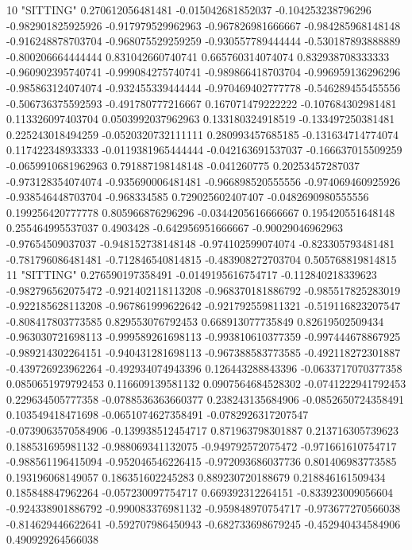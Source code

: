 10 "SITTING" 0.270612056481481 -0.015042681852037 -0.104253238796296 -0.982901825925926 -0.917979529962963 -0.967826981666667 -0.984285968148148 -0.916248878703704 -0.968075529259259 -0.930557789444444 -0.530187893888889 -0.800206664444444 0.831042660740741 0.665760314074074 0.832938708333333 -0.960902395740741 -0.999084275740741 -0.989866418703704 -0.996959136296296 -0.985863124074074 -0.932455339444444 -0.970469402777778 -0.546289455455556 -0.506736375592593 -0.491780777216667 0.167071479222222 -0.107684302981481 0.113326097403704 0.0503992037962963 0.133180324918519 -0.133497250381481 0.225243018494259 -0.0520320732111111 0.280993457685185 -0.131634714774074 0.117422348933333 -0.0119381965444444 -0.042163691537037 -0.166637015509259 -0.0659910681962963 0.791887198148148 -0.041260775 0.20253457287037 -0.973128354074074 -0.935690006481481 -0.966898520555556 -0.974069460925926 -0.938546448703704 -0.968334585 0.729025602407407 -0.0482690980555556 0.199256420777778 0.805966876296296 -0.0344205616666667 0.195420551648148 0.255464995537037 0.4903428 -0.642956951666667 -0.90029046962963 -0.97654509037037 -0.948152738148148 -0.974102599074074 -0.823305793481481 -0.781796086481481 -0.712846540814815 -0.483908272703704 0.505768819814815
11 "SITTING" 0.276590197358491 -0.0149195616754717 -0.112840218339623 -0.982796562075472 -0.921402118113208 -0.968370181886792 -0.985517825283019 -0.922185628113208 -0.967861999622642 -0.921792559811321 -0.519116823207547 -0.808417803773585 0.829553076792453 0.668913077735849 0.82619502509434 -0.963030721698113 -0.999589261698113 -0.993810610377359 -0.997444678867925 -0.989214302264151 -0.940431281698113 -0.967388583773585 -0.492118272301887 -0.439726923962264 -0.492934074943396 0.126443288843396 -0.0633717070377358 0.0850651979792453 0.116609139581132 0.0907564684528302 -0.0741222941792453 0.229634505777358 -0.0788536363660377 0.238243135684906 -0.0852650724358491 0.103549418471698 -0.0651074627358491 -0.0782926317207547 -0.0739063570584906 -0.139938512454717 0.871963798301887 0.213716305739623 0.188531695981132 -0.988069341132075 -0.949792572075472 -0.971661610754717 -0.988561196415094 -0.952046546226415 -0.972093686037736 0.801406983773585 0.193196068149057 0.186351602245283 0.889230720188679 0.218846161509434 0.185848847962264 -0.057230097754717 0.669392312264151 -0.833923009056604 -0.924338901886792 -0.990083376981132 -0.959848970754717 -0.973677270566038 -0.814629446622641 -0.592707986450943 -0.682733698679245 -0.452940434584906 0.490929264566038
